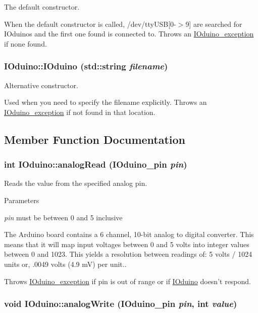 The default constructor. 

When the default constructor is called, /dev/ttyUSB\mbox{[}0-\/$>$9\mbox{]} are searched for IOduinos and the first one found is connected to. Throws an \hyperlink{classIOduino__exception}{IOduino\_\-exception} if none found. \hypertarget{classIOduino_aa7454913efdbd714680459a612f9f440}{
\subsubsection[{IOduino}]{\setlength{\rightskip}{0pt plus 5cm}IOduino::IOduino (std::string {\em filename})}}
\label{classIOduino_aa7454913efdbd714680459a612f9f440}


Alternative constructor. 

Used when you need to specify the filename explicitly. Throws an \hyperlink{classIOduino__exception}{IOduino\_\-exception} if not found in that location. 

\subsection{Member Function Documentation}
\hypertarget{classIOduino_a6dc01079f940a16884f4fd0cc29f8406}{
\subsubsection[{analogRead}]{\setlength{\rightskip}{0pt plus 5cm}int IOduino::analogRead (IOduino\_\-pin {\em pin})}}
\label{classIOduino_a6dc01079f940a16884f4fd0cc29f8406}


Reads the value from the specified analog pin. 


\begin{DoxyParams}{Parameters}
\item[{\em pin}]must be between 0 and 5 inclusive\end{DoxyParams}
The Arduino board contains a 6 channel, 10-\/bit analog to digital converter. This means that it will map input voltages between 0 and 5 volts into integer values between 0 and 1023. This yields a resolution between readings of: 5 volts / 1024 units or, .0049 volts (4.9 mV) per unit..

Throws \hyperlink{classIOduino__exception}{IOduino\_\-exception} if pin is out of range or if \hyperlink{classIOduino}{IOduino} doesn't respond. \hypertarget{classIOduino_a8fc8b7253bb8c4e7a339997221ce3522}{
\subsubsection[{analogWrite}]{\setlength{\rightskip}{0pt plus 5cm}void IOduino::analogWrite (IOduino\_\-pin {\em pin}, \/  int {\em value})}}
\label{classIOduino_a8fc8b7253bb8c4e7a339997221ce3522}


